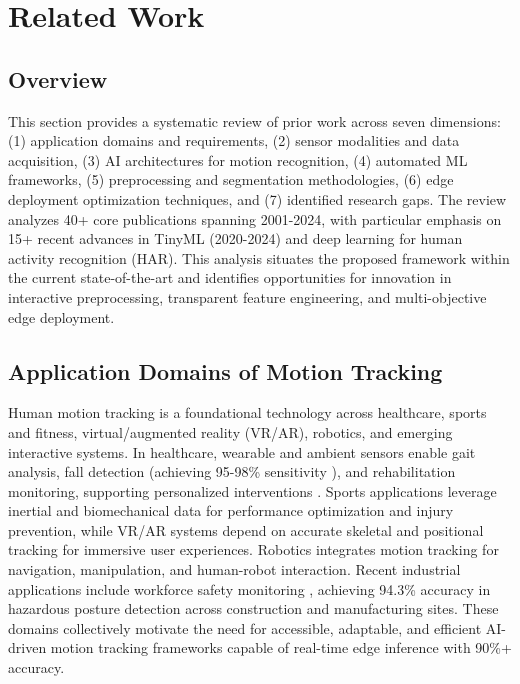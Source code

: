 \chapter{Related Work}
\label{chap:relatedwork}

\section{Overview}
This section provides a systematic review of prior work across seven dimensions: (1) application domains and requirements, (2) sensor modalities and data acquisition, (3) AI architectures for motion recognition, (4) automated ML frameworks, (5) preprocessing and segmentation methodologies, (6) edge deployment optimization techniques, and (7) identified research gaps. The review analyzes 40+ core publications spanning 2001-2024, with particular emphasis on 15+ recent advances in TinyML (2020-2024) and deep learning for human activity recognition (HAR). This analysis situates the proposed framework within the current state-of-the-art and identifies opportunities for innovation in interactive preprocessing, transparent feature engineering, and multi-objective edge deployment.

\section{Application Domains of Motion Tracking}
Human motion tracking is a foundational technology across healthcare, sports and fitness, virtual/augmented reality (VR/AR), robotics, and emerging interactive systems. In healthcare, wearable and ambient sensors enable gait analysis, fall detection (achieving 95-98\% sensitivity \cite{wan2021deep_har_review}), and rehabilitation monitoring, supporting personalized interventions \cite{article:human_motion_tracking_survey}. Sports applications leverage inertial and biomechanical data for performance optimization and injury prevention, while VR/AR systems depend on accurate skeletal and positional tracking for immersive user experiences. Robotics integrates motion tracking for navigation, manipulation, and human-robot interaction. Recent industrial applications include workforce safety monitoring \cite{wang2023har_industrial}, achieving 94.3\% accuracy in hazardous posture detection across construction and manufacturing sites. These domains collectively motivate the need for accessible, adaptable, and efficient AI-driven motion tracking frameworks capable of real-time edge inference with 90\%+ accuracy.

